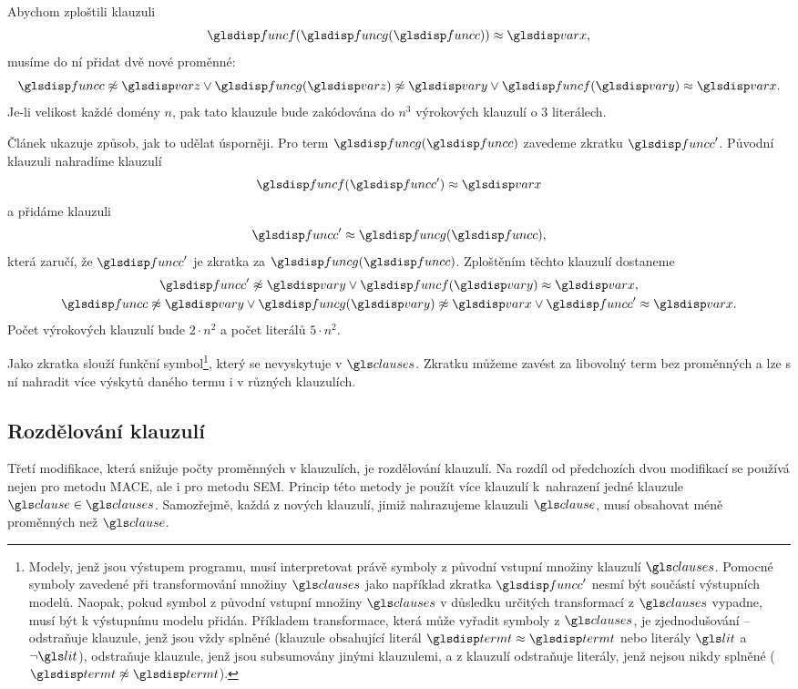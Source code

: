Abychom zploštili klauzuli
\[
  \func(\funcG(\funcC)) \approx \var,
\]
musíme do ní přidat dvě nové proměnné:
\[
  \funcC \not\approx \varZ \vee
    \funcG(\varZ) \not\approx \varY \vee
    \func(\varY) \approx \var.
\]
Je-li velikost každé domény $n$, pak tato klauzule bude
zakódována do $n^3$ vý\-ro\-ko\-vých klauzulí o 3 literálech.

Článek \cite{claessen03paradox} ukazuje způsob, jak to udělat
úsporněji. Pro term $\funcG(\funcC)$ zavedeme zkratku $\funcC'$.
Původní klauzuli nahradíme klauzulí
\[
  \func(\funcC') \approx \var
\]
a přidáme klauzuli
\[
  \funcC' \approx \funcG(\funcC),
\]
která zaručí, že $\funcC'$ je zkratka za $\funcG(\funcC)$.
Zploštěním těchto klauzulí dostaneme
\begin{gather*}
  \funcC' \not\approx \varY \vee \func(\varY) \approx \var, \\
  \funcC \not\approx \varY \vee
    \funcG(\varY) \not\approx \var \vee
    \funcC' \approx \var.
\end{gather*}
Počet výrokových klauzulí bude $2 \cdot n^2$ a počet literálů
$5 \cdot n^2$.

Jako zkratka slouží funkční symbol\footnote{Modely, jenž jsou
výstupem programu, musí interpretovat právě symboly z původní vstupní množiny
klauzulí $\clauses$. Pomocné symboly zavedené
při transformování množiny $\clauses$ jako například zkratka $\funcC'$
nesmí být součástí výstupních modelů. Naopak, pokud symbol
z původní vstupní množiny $\clauses$ v důsledku určitých transformací
z $\clauses$ vypadne, musí být k výstupnímu modelu přidán.
Příkladem transformace, která může vyřadit symboly z $\clauses$,
je zjednodušování -- odstraňuje klauzule, jenž jsou vždy splněné
(klauzule obsahující literál $\term \approx \term$ nebo literály
$\lit$ a $\neg \lit$), odstraňuje klauzule, jenž
jsou subsumovány jinými klauzulemi,
a z klauzulí odstraňuje literály, jenž nejsou nikdy splněné
($\term \not\approx \term$).},
který se nevyskytuje v $\clauses$.
Zkratku můžeme zavést za libovolný term bez proměnných
a lze s ní nahradit více výskytů daného termu i v různých klauzulích.

\subsection{Rozdělování klauzulí}

Třetí modifikace, která snižuje počty proměnných v klauzulích,
je rozdělování klauzulí. Na rozdíl od předchozích dvou modifikací
se používá nejen pro metodu MACE, ale i pro metodu SEM.
Princip této metody je použít více klauzulí k~nahrazení jedné
klauzule $\clause \in \clauses$.
Samozřejmě, každá z nových klauzulí, jimiž nahrazujeme klauzuli $\clause$,
musí obsahovat méně proměnných než $\clause$.

